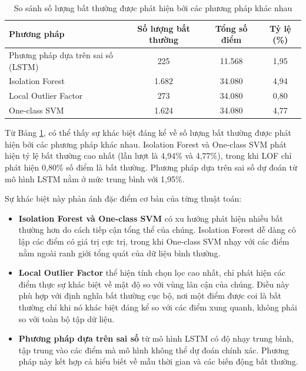 \begin{table}[htbp]
    \centering
    \begin{tabular}{|l|c|c|c|}
        \hline
        \textbf{Phương pháp} & \textbf{Số lượng bất thường} & \textbf{Tổng số điểm} & \textbf{Tỷ lệ (\%)} \\
        \hline
        Phương pháp dựa trên sai số (LSTM) & 225 & 11.568 & 1,95 \\
        \hline
        Isolation Forest & 1.682 & 34.080 & 4,94 \\
        \hline
        Local Outlier Factor & 273 & 34.080 & 0,80 \\
        \hline
        One-class SVM & 1.624 & 34.080 & 4,77 \\
        \hline
    \end{tabular}
    \caption{So sánh số lượng bất thường được phát hiện bởi các phương pháp khác nhau}
    \label{tab:anomaly_methods_comparison}
\end{table}

Từ Bảng \ref{tab:anomaly_methods_comparison}, có thể thấy sự khác biệt đáng kể về số lượng bất thường được phát hiện bởi các phương pháp khác nhau. Isolation Forest và One-class SVM phát hiện tỷ lệ bất thường cao nhất (lần lượt là 4,94\% và 4,77\%), trong khi LOF chỉ phát hiện 0,80\% số điểm là bất thường. Phương pháp dựa trên sai số dự đoán từ mô hình LSTM nằm ở mức trung bình với 1,95\%.


Sự khác biệt này phản ánh đặc điểm cơ bản của từng thuật toán:

\begin{itemize}
    \item \textbf{Isolation Forest và One-class SVM} có xu hướng phát hiện nhiều bất thường hơn do cách tiếp cận tổng thể của chúng. Isolation Forest dễ dàng cô lập các điểm có giá trị cực trị, trong khi One-class SVM nhạy với các điểm nằm ngoài ranh giới tổng quát của dữ liệu bình thường.
    
    \item \textbf{Local Outlier Factor} thể hiện tính chọn lọc cao nhất, chỉ phát hiện các điểm thực sự khác biệt về mật độ so với vùng lân cận của chúng. Điều này phù hợp với định nghĩa bất thường cục bộ, nơi một điểm được coi là bất thường chỉ khi nó khác biệt đáng kể so với các điểm xung quanh, không phải so với toàn bộ tập dữ liệu.
    
    \item \textbf{Phương pháp dựa trên sai số} từ mô hình LSTM có độ nhạy trung bình, tập trung vào các điểm mà mô hình không thể dự đoán chính xác. Phương pháp này kết hợp cả hiểu biết về mẫu thời gian và các biến động bất thường.
\end{itemize}

